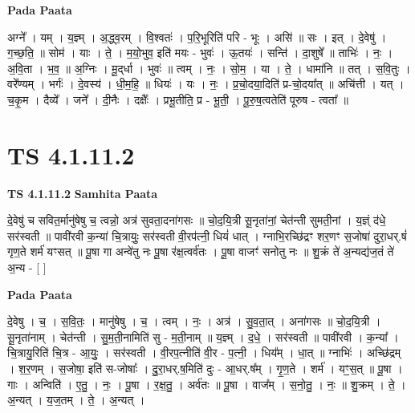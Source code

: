 \documentclass[17pt]{extarticle}
\begin{document}
\textbf{Pada Paata} \newline

अग्ने᳚ । यम् । य॒ज्ञ्म् । अ॒द्ध्व॒रम् । वि॒श्वतः॑ । प॒रि॒भूरिति॑ परि - भूः । असि॑ ॥ सः । इत् । दे॒वेषु॑ । ग॒च्छ॒ति॒ ॥ सोम॑ । याः । ते॒ । म॒यो॒भुव॒ इति॑ मयः - भुवः॑ । ऊ॒तयः॑ । सन्ति॑ । दा॒शुषे᳚ ॥ ताभिः॑ । नः॒ । अ॒वि॒ता । भ॒व॒ ॥ अ॒ग्निः । मू॒द्‌र्धा । भुवः॑ ॥ त्वम् । नः॒ । सो॒म॒ । या । ते॒ । धामा॑नि ॥ तत् । स॒वि॒तुः । वरे᳚ण्यम् । भर्गः॑ । दे॒वस्य॑ । धी॒म॒हि॒ ॥ धियः॑ । यः । नः॒ । प्र॒चो॒दया॒दिति॑ प्र-चो॒दया᳚त् ॥ अचि॑त्ती । यत् । च॒कृ॒म । दैव्ये᳚ । जने᳚ । दी॒नैः । दक्षैः᳚ । प्रभू॒तीति॒ प्र - भू॒ती॒ । पू॒रु॒ष॒त्वतेति॑ पूरुष - त्वता᳚ ॥  \newline




\section*{ TS 4.1.11.2 }

\textbf{TS 4.1.11.2 } \newline
\textbf{Samhita Paata} \newline

दे॒वेषु॑ च सवित॒र्मानु॑षेषु च॒ त्वन्नो॒ अत्र॑ सुवता॒दना॑गसः ॥ चो॒द॒यि॒त्री सू॒नृता॑नां॒ चेत॑न्ती सुमती॒नां । य॒ज्ञ्ं द॑धे॒ सर॑स्वती ॥ पावी॑रवी क॒न्या॑ चि॒त्रायुः॒ सर॑स्वती वी॒रप॑त्नी॒ धियं॑ धात् । ग्नाभि॒रच्छि॑द्रꣳ शर॒णꣳ स॒जोषा॑ दुरा॒धर्.षं॑ गृण॒ते शर्म॑ यꣳसत् ॥ पू॒षा गा अन्वे॑तु नः पू॒षा र॑क्ष॒त्वर्व॑तः । पू॒षा वाजꣳ॑ सनोतु नः ॥ शु॒क्रं ते॑ अ॒न्यद्य॑ज॒तं ते॑ अ॒न्य - [  ] \newline

\textbf{Pada Paata} \newline

दे॒वेषु । च॒ । स॒वि॒तः॒ । मानु॑षेषु । च॒ । त्वम् । नः॒ । अत्र॑ । सु॒व॒ता॒त् । अना॑गसः ॥ चो॒द॒यि॒त्री । सू॒नृता॑नाम् । चेत॑न्ती । सु॒म॒ती॒नामिति॑ सु - म॒ती॒नाम् ॥ य॒ज्ञ्म् । द॒धे॒ । सर॑स्वती ॥ पावी॑रवी । क॒न्या᳚ । चि॒त्रायु॒रिति॑ चि॒त्र - आ॒युः॒ । सर॑स्वती । वी॒रप॒त्नीति॑ वी॒र - प॒त्नी॒ । धिय᳚म् । धा॒त् ॥ ग्नाभिः॑ । अच्छि॑द्रम् । श॒र॒णम् । स॒जोषा॒ इति॑ स-जोषाः᳚ । दु॒रा॒धर्.ष॒मिति॑ दुः - आ॒धर्.ष᳚म् । गृ॒ण॒ते । शर्म॑ । यꣳ॒॒स॒त् ॥ पू॒षा । गाः । अन्विति॑ । ए॒तु॒ । नः॒ । पू॒षा । र॒क्ष॒तु॒ । अर्व॑तः ॥ पू॒षा । वाज᳚म् । स॒नो॒तु॒ । नः॒ ॥ शु॒क्रम् । ते॒ । अ॒न्यत् । य॒ज॒तम् । ते॒ । अ॒न्यत् ।  \newline




\end{document}
